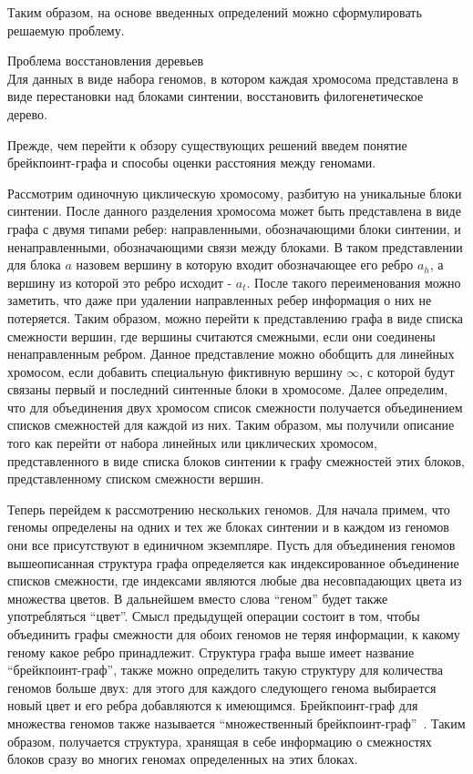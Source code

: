 Таким образом, на основе введенных определений можно сформулировать решаемую проблему.
\begin{prob}{Проблема восстановления деревьев} \\
  Для данных в виде набора геномов, в котором каждая хромосома представлена в виде перестановки над блоками синтении,
  восстановить филогенетическое дерево.
\end{prob}

Прежде, чем перейти к обзору существующих решений введем понятие брейкпоинт-графа и способы оценки расстояния между геномами.

Рассмотрим одиночную циклическую хромосому, разбитую на уникальные блоки синтении.
После данного разделения хромосома может быть представлена в виде графа с двумя типами ребер: направленными, обозначающими блоки синтении,
и ненаправленными, обозначающими связи между блоками.
В таком представлении для блока $a$ назовем вершину в которую входит обозначающее его ребро $a_h$, а вершину из которой это ребро исходит - $a_t$.
После такого переименования можно заметить, что даже при удалении направленных ребер информация о них не потеряется.
Таким образом, можно перейти к представлению графа в виде списка смежности вершин,
где вершины считаются смежными, если они соединены ненаправленным ребром.
Данное представление можно обобщить для линейных хромосом, если добавить специальную фиктивную вершину $\infty$, с которой будут связаны первый и последний синтенные блоки в хромосоме.
Далее определим, что для объединения двух хромосом список смежности получается объединением списков смежностей для каждой из них.
Таким образом, мы получили описание того как перейти от набора линейных или циклических хромосом, представленного
в виде списка блоков синтении к графу смежностей этих блоков, представленному списком смежности вершин.

Теперь перейдем к рассмотрению нескольких геномов.
Для начала примем, что геномы определены на одних и тех же блоках синтении и в каждом из геномов они все присутствуют в единичном экземпляре.
Пусть для объединения геномов вышеописанная структура графа определяется как индексированное объединение списков смежности,
где индексами являются любые два несовпадающих цвета из множества цветов.
В дальнейшем вместо слова ``геном'' будет также употребляться ``цвет''.
Смысл предыдущей операции состоит в том, чтобы объединить графы смежности для обоих геномов не теряя информации, к какому геному какое ребро принадлежит.
Структура графа выше имеет название ``брейкпоинт-граф'', также можно определить такую структуру для количества геномов больше двух:
для этого для каждого следующего генома выбирается новый цвет и его ребра добавляются к имеющимся.
Брейкпоинт-граф для множества геномов также называется ``множественный брейкпоинт-граф''~\cite{caprara1999tightness}.
Таким образом, получается структура, хранящая в себе информацию о смежностях блоков сразу во многих геномах определенных на этих блоках.

